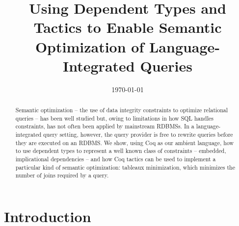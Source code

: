 \documentclass[preprint]{sigplanconf}
\begin{document}
\title{Using Dependent Types and Tactics to Enable Semantic Optimization of Language-Integrated Queries}



\date{\today}

\maketitle
\begin{abstract}
Semantic optimization -- the use of data integrity constraints to optimize relational queries -- has been well studied but, owing to limitations in how SQL handles constraints, has not often been applied by mainstream RDBMSs. In a language-integrated query setting, however, the query provider is free to rewrite queries before they are executed on an RDBMS.  We show, using Coq as our ambient language, how to use dependent types to represent a well known class of constraints -- embedded, implicational dependencies -- and how Coq tactics can be used to implement a particular kind of semantic optimization: tableaux minimization, which minimizes the number of joins required by a query.
\end{abstract}

\section{Introduction}
\end{document}
